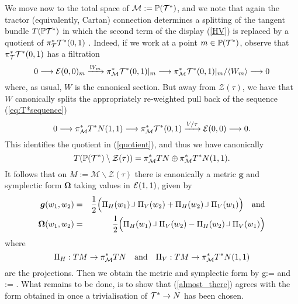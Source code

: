 We move now to the total space of $\mathcal{M}:=\mathbb{P}( {\mathcal{T}^*})$, and we note that again the tractor (equivalently, Cartan) connection determines a splitting of the tangent bundle $T(\mathbb{P} {\mathcal{T}^*})$ in which the second term of the display (\ref{HV}) is replaced by a quotient of $\pi_{\mathcal{T}}^* \mathcal{T}^*(0,1)$ \cite{CGH-duke}. Indeed, if we work at a point $m\in \mathbb{P}(\mathcal{T}^*)$, observe that $\pi_{\mathcal{T}}^*\mathcal{T}^*(0,1)$ has a filtration
\begin{equation}\label{quotient}
0\longrightarrow \mathcal{E} (0,0)_m\xrightarrow{W_m}  \pi_{\mathcal{M}}^* \mathcal{T}^*(0,1)|_m \longrightarrow  \pi_{\mathcal{M}}^* \mathcal{T}^*(0,1)|_m/\langle W_m \rangle \longrightarrow 0
\end{equation}
where, as usual, $W$ is the canonical section. 
But away from $\mathcal{Z}(\tau )$, we have that  $W$ canonically splits 
the appropriately re-weighted pull back of  the sequence (\ref{eq:T*sequence})
$$
0\longrightarrow \pi_{\mathcal{M}}^* T^*N(1,1)   \longrightarrow \pi_{\mathcal{M}}^* \mathcal{T}^*(0,1) \xrightarrow{V/\tau} \mathcal{E}(0,0) \longrightarrow 0 .
$$
This identifies the quotient in (\ref{quotient}), and thus we have canonically
$$
T(\mathbb{P}(\mathcal{T}^*)\setminus \mathcal{Z}(\tau))=  \pi_{\mathcal{M}}^*TN\oplus \pi_{\mathcal{M}}^*T^*N(1,1).
$$
It follows that on  $M:=\mathcal{M}\backslash\mathcal{Z}(\tau)$
there is canonically a metric $\boldsymbol{g}$ and symplectic form $\boldsymbol{\Omega}$ taking values in $\mathcal{E}(1,1)$, given by
\begin{eqnarray*}
\boldsymbol{g}(w_1,w_2)&=& \frac{1}{2}\Bigl(
\Pi_H(w_1)\hook \Pi_V(w_2)+\Pi_H(w_2)\hook\Pi_V(w_1)\Bigl) \quad \mbox{and} \\
\boldsymbol{\Omega}(w_1,w_2)&=& \frac{1}{2}\Bigl(\Pi_H(w_1)\hook \Pi_V(w_2)-\Pi_H(w_2)\hook\Pi_V(w_1)\Bigl)
\end{eqnarray*}
where
\[
\Pi_H: TM\rightarrow \pi_{\mathcal{M}}^*TN \quad \mbox{and} \quad \Pi_V: TM\rightarrow \pi_{\mathcal{M}}^* T^*N(1,1)
\]
are the projections.
Then we obtain the metric and symplectic form by
\be
\label{almost_there}
g:= \qquad \mbox{and} \qquad \Omega:=\boldsymbol{\Omega} .
\ee
What remains to be done, is to show that (\ref{almost_there}) agrees
with the form obtained in \cite{DM} once a trivialisation of
$\mathcal{T}^*\rightarrow N$ has been chosen.

